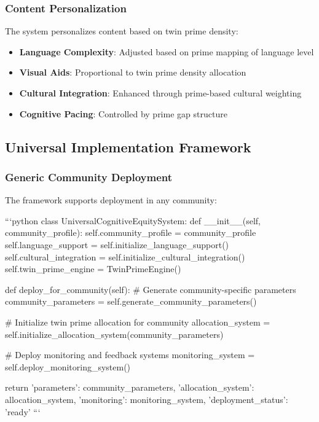 \documentclass[12pt,a4paper]{article}
\begin{document}
\subsubsection{Content Personalization}

The system personalizes content based on twin prime density:

\begin{itemize}
    \item \textbf{Language Complexity}: Adjusted based on prime mapping of language level
    \item \textbf{Visual Aids}: Proportional to twin prime density allocation
    \item \textbf{Cultural Integration}: Enhanced through prime-based cultural weighting
    \item \textbf{Cognitive Pacing}: Controlled by prime gap structure
\end{itemize}

\subsection{Universal Implementation Framework}

\subsubsection{Generic Community Deployment}

The framework supports deployment in any community:

```python
class UniversalCognitiveEquitySystem:
    def __init__(self, community_profile):
        self.community_profile = community_profile
        self.language_support = self.initialize_language_support()
        self.cultural_integration = self.initialize_cultural_integration()
        self.twin_prime_engine = TwinPrimeEngine()
        
    def deploy_for_community(self):
        # Generate community-specific parameters
        community_parameters = self.generate_community_parameters()
        
        # Initialize twin prime allocation for community
        allocation_system = self.initialize_allocation_system(community_parameters)
        
        # Deploy monitoring and feedback systems
        monitoring_system = self.deploy_monitoring_system()
        
        return {
            'parameters': community_parameters,
            'allocation_system': allocation_system,
            'monitoring': monitoring_system,
            'deployment_status': 'ready'
        }
```
\end{document}
